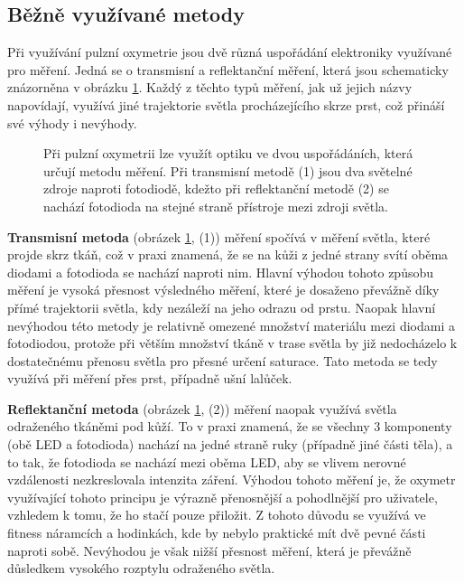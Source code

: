 \subsection {Běžně využívané metody}
Při využívání pulzní oxymetrie jsou dvě různá uspořádání elektroniky využívané pro měření. Jedná se o transmisní a reflektanční měření, která jsou schematicky znázorněna v obrázku \ref{fig:Metody}. Každý z těchto typů měření, jak už jejich názvy napovídají, využívá jiné trajektorie světla procházejícího skrze prst, což přináší své výhody i nevýhody.
\begin{figure}[H]
    \def\svgwidth{\columnwidth}
    
    \caption [Transmisní a reflektanční metoda]{Při pulzní oxymetrii lze využít optiku ve dvou uspořádáních, která určují metodu měření. Při transmisní metodě (1) jsou dva světelné zdroje naproti fotodiodě, kdežto při reflektanční metodě (2) se nachází fotodioda na stejné straně přístroje mezi zdroji světla.}
    \label{fig:Metody}
\end{figure}
\par \textbf{Transmisní metoda} (obrázek \ref{fig:Metody}, (1)) měření spočívá v měření světla, které projde skrz tkáň, což v praxi znamená, že se na kůži z jedné strany svítí oběma diodami a fotodioda se nachází naproti nim. Hlavní výhodou tohoto způsobu měření je vysoká přesnost výsledného měření, které je dosaženo převážně díky přímé trajektorii světla, kdy nezáleží na jeho odrazu od prstu. Naopak hlavní nevýhodou této metody je relativně omezené množství materiálu mezi diodami a fotodiodou, protože při větším množství tkáně v trase světla by již nedocházelo k dostatečnému přenosu světla pro přesné určení saturace. Tato metoda se tedy využívá při měření přes prst, případně ušní lalůček.
\par \textbf{Reflektanční metoda} (obrázek \ref{fig:Metody}, (2)) měření naopak využívá světla odraženého tkáněmi pod kůží. To v praxi znamená, že se všechny 3 komponenty (obě LED a fotodioda) nachází na jedné straně ruky (případně jiné části těla), a to tak, že fotodioda se nachází mezi oběma LED, aby se vlivem nerovné vzdálenosti nezkreslovala intenzita záření. Výhodou tohoto měření je, že oxymetr využívající tohoto principu je výrazně přenosnější a pohodlnější pro uživatele, vzhledem k tomu, že ho stačí pouze přiložit. Z tohoto důvodu se využívá ve fitness náramcích a hodinkách, kde by nebylo praktické mít dvě pevné části naproti sobě. Nevýhodou je však nižší přesnost měření, která je převážně důsledkem vysokého rozptylu odraženého světla.
